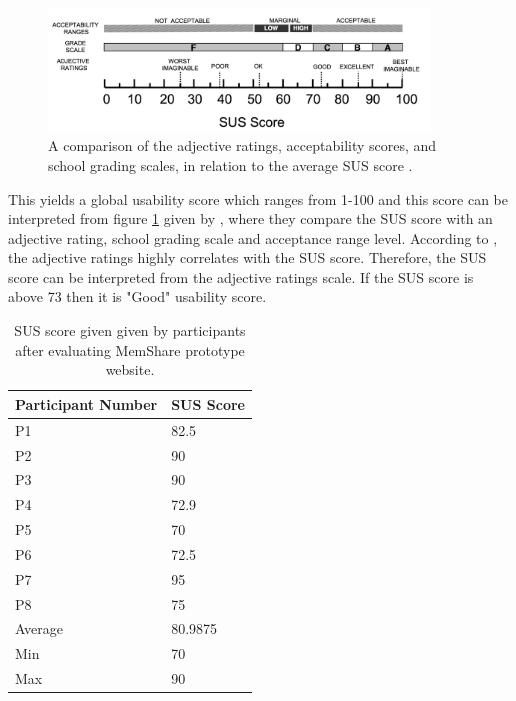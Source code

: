 \documentclass[mscthesis]{usiinfthesis}
\begin{document}
\begin{figure}[!ht]
  \centering
  \includegraphics[width=0.9\textwidth]{susf}
  \caption{A comparison of the adjective ratings, acceptability scores, and school grading scales, in relation to the average SUS score \citep{bangor_determining_2009}.}
  \label{fig20}
\end{figure}

This yields a global usability score which ranges from 1-100 and this score can be interpreted from figure \ref{fig20} given by \citeauthor{bangor_determining_2009}, where they compare the SUS score with an adjective rating, school grading scale and acceptance range level. According to \citeauthor{bangor_determining_2009}, the adjective ratings highly correlates with the SUS score. Therefore, the SUS score can be interpreted from the adjective ratings scale. If the SUS score is above 73 then it is "Good" usability score. 

\begin{table}[!ht]
\centering
\begin{tabular}{|l|l|}
\hline
Participant Number & SUS Score \\ \hline
P1                 & 82.5      \\ \hline
P2                 & 90        \\ \hline
P3                 & 90        \\ \hline
P4                 & 72.9      \\ \hline
P5                 & 70        \\ \hline
P6                 & 72.5      \\ \hline
P7                 & 95        \\ \hline
P8                 & 75        \\ \hline
Average            & 80.9875   \\ \hline
Min                & 70        \\ \hline
Max                & 90        \\ \hline
\end{tabular}
\caption{SUS score given given by participants after evaluating MemShare prototype website.}
\label{tab7}
\end{table}
\end{document}
